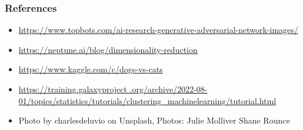 \documentclass[aspectratio=169]{beamer}
\begin{document}
\begin{frame}
\frametitle{References}
{\footnotesize
\begin{itemize}
	\item \url{https://www.topbots.com/ai-research-generative-adversarial-network-images/}
	\item \url{https://neptune.ai/blog/dimensionality-reduction}
	\item \url{https://www.kaggle.com/c/dogs-vs-cats}
	\item \url{https://training.galaxyproject   .org/archive/2022-08-01/topics/statistics/tutorials/clustering_machinelearning/tutorial.html}
	\item Photo by charlesdeluvio on Unsplash, Photos: 
	Julie Molliver
	Shane Rounce
\end{itemize}
}
\end{frame}
%
%
\end{document}
